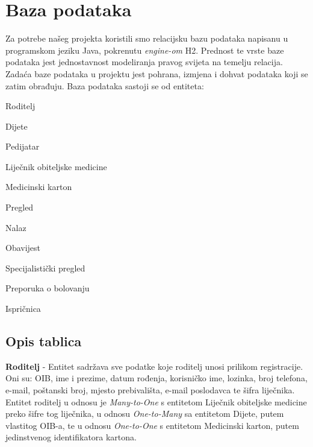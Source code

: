 		
		

				
		\section{Baza podataka}
			
			\text Za potrebe našeg projekta koristili smo relacijsku bazu podataka napisanu u programskom jeziku Java, pokrenutu \textit{engine-om} H2. Prednost te vrste baze podataka jest jednostavnost modeliranja pravog svijeta na temelju relacija. Zadaća baze podataka u projektu jest pohrana, izmjena i dohvat podataka koji se zatim obrađuju. Baza podataka sastoji se od entiteta:
			\begin{packed_item}
				\item Roditelj
				\item Dijete
				\item Pedijatar
				\item Liječnik obiteljske medicine
				\item Medicinski karton
				\item Pregled
				\item Nalaz
				\item Obavijest
				\item Specijalistički pregled
				\item Preporuka o bolovanju
				\item Ispričnica
			\end{packed_item}
		
			\subsection{Opis tablica}
			

				\textbf{Roditelj} - Entitet sadržava sve podatke koje roditelj unosi prilikom registracije. Oni su: OIB, ime i prezime, datum rođenja, korisničko ime, lozinka, broj telefona, e-mail, poštanski broj, mjesto prebivališta, e-mail poslodavca te šifra liječnika. Entitet roditelj u odnosu je \textit{Many-to-One} s entitetom Liječnik obiteljske medicine preko šifre tog liječnika, u odnosu \textit{One-to-Many} sa entitetom Dijete, putem vlastitog OIB-a, te u odnosu \textit{One-to-One} s entitetom Medicinski karton, putem jedinstvenog identifikatora kartona.
				

